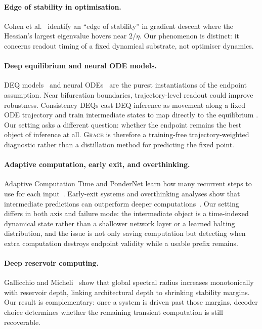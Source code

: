 \documentclass{article}
\theoremstyle{remark}
\newcommand{\grace}{\textnormal{\textsc{Grace}}}
\begin{document}
\paragraph{Edge of stability in optimisation.}
Cohen et al.~\citep{cohen2021gradient} identify an ``edge of stability'' in
gradient descent where the Hessian's largest eigenvalue hovers near $2/\eta$.
Our phenomenon is distinct: it concerns readout timing of a fixed dynamical
substrate, not optimiser dynamics.

\paragraph{Deep equilibrium and neural ODE models.}
DEQ models~\citep{bai2019deep} and neural ODEs~\citep{chen2018neural} are
the purest instantiations of the endpoint assumption. Near bifurcation
boundaries, trajectory-level readout could improve robustness. Consistency
DEQs cast DEQ inference as movement along a fixed ODE trajectory and train
intermediate states to map directly to the equilibrium
\citep{lin2026consistency}. Our setting asks a different question: whether the
endpoint remains the best object of inference at all. \grace{} is therefore a
training-free trajectory-weighted diagnostic rather than a distillation method
for predicting the fixed point.

\paragraph{Adaptive computation, early exit, and overthinking.}
Adaptive Computation Time and PonderNet learn how many recurrent steps to use
for each input~\citep{graves2016adaptive,banino2021pondernet}.
Early-exit systems and overthinking analyses show that intermediate
predictions can outperform deeper computations~\citep{teerapittayanon2016branchynet,
kaya2019shallow,elhoushi2024layerskip}. Our setting differs in both axis and
failure mode: the intermediate object is a time-indexed dynamical state rather
than a shallower network layer or a learned halting distribution, and the issue
is not only saving computation but detecting when extra computation destroys
endpoint validity while a usable prefix remains.

\paragraph{Deep reservoir computing.}
Gallicchio and Micheli~\citep{gallicchio2017echo} show that global spectral
radius increases monotonically with reservoir depth, linking architectural
depth to shrinking stability margins. Our result is complementary: once a
system is driven past those margins, decoder choice determines whether the
remaining transient computation is still recoverable.
\end{document}
